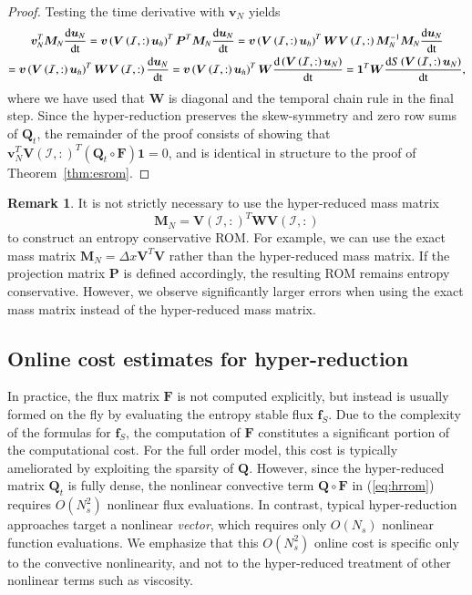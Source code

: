 \documentclass[preprint,10pt]{elsarticle}
\theoremstyle{definition}
\theoremstyle{lemma}
\newtheorem*{remark}{Remark}
\theoremstyle{theorem}
\theoremstyle{assumption}
\newcommand{\td}[2]{\frac{{\rm d}#1}{{\rm d}{\rm #2}}}
\newcommand{\LRp}[1]{\left( #1 \right)}
\begin{document}
\begin{proof}
Testing the time derivative with $\bm{v}_N$ yields
\begin{gather*}
\bm{v}_N^T\bm{M}_N\td{\bm{u}_N}{t} = \bm{v}\LRp{\bm{V}\LRp{\mathcal{I},:}\bm{u}_h}^T\bm{P}^T\bm{M}_N\td{\bm{u}_N}{t} = \bm{v}\LRp{\bm{V}\LRp{\mathcal{I},:}\bm{u}_h}^T \bm{W}\bm{V}\LRp{\mathcal{I},:}\bm{M}_N^{-1}\bm{M}_N\td{\bm{u}_N}{t}
\\
= \bm{v}\LRp{\bm{V}\LRp{\mathcal{I},:}\bm{u}_h}^T \bm{W} \bm{V}\LRp{\mathcal{I},:}\td{\bm{u}_N}{t} = \bm{v}\LRp{\bm{V}\LRp{\mathcal{I},:}\bm{u}_h}^T \bm{W} \td{\LRp{\bm{V}\LRp{\mathcal{I},:}\bm{u}_N}}{t} = \bm{1}^T\bm{W}\td{S\LRp{\bm{V}\LRp{\mathcal{I},:}\bm{u}_N}}{t},
\end{gather*}
where we have used that $\bm{W}$ is diagonal and the temporal chain rule in the final step.  
Since the hyper-reduction preserves the skew-symmetry and zero row sums of $\bm{Q}_t$, the remainder of the proof consists of showing that $\bm{v}_N^T\bm{V}\LRp{\mathcal{I},:}^T\LRp{\bm{Q}_t \circ \bm{F}}\bm{1} = 0$, and is identical in structure to the proof of Theorem~\ref{thm:esrom}.  
\end{proof}

\begin{remark}
It is not strictly necessary to use the hyper-reduced mass matrix 
\[
\bm{M}_N = \bm{V}\LRp{\mathcal{I},:}^T\bm{W}\bm{V}\LRp{\mathcal{I},:}
\]
 to construct an entropy conservative ROM.  For example, we can use the exact mass matrix $\bm{M}_N = \Delta x \bm{V}^T\bm{V}$ rather than the hyper-reduced mass matrix.  If the projection matrix $\bm{P}$ is defined accordingly, the resulting ROM remains entropy conservative.  However, we observe significantly larger errors when using the exact mass matrix instead of the hyper-reduced mass matrix.  
\end{remark}

\subsection{Online cost estimates for hyper-reduction}
\label{sec:cost}
In practice, the flux matrix $\bm{F}$ is not computed explicitly, but instead is usually formed on the fly by evaluating the entropy stable flux $\bm{f}_S$.  Due to the complexity of the formulas for $\bm{f}_S$, the computation of $\bm{F}$ constitutes a significant portion of the computational cost.  For the full order model, this cost is typically ameliorated by exploiting the sparsity of $\bm{Q}$.  However, since the hyper-reduced matrix $\bm{Q}_t$ is fully dense, the nonlinear convective term $\bm{Q}\circ\bm{F}$ in (\ref{eq:hrrom}) requires $O(N_s^2)$ nonlinear flux evaluations.  In contrast, typical hyper-reduction approaches target a nonlinear \textit{vector}, which requires only $O(N_s)$ nonlinear function evaluations.  We emphasize that this $O(N_s^2)$ online cost is specific only to the convective nonlinearity, and not to the hyper-reduced treatment of other nonlinear terms such as viscosity.
\end{document}
